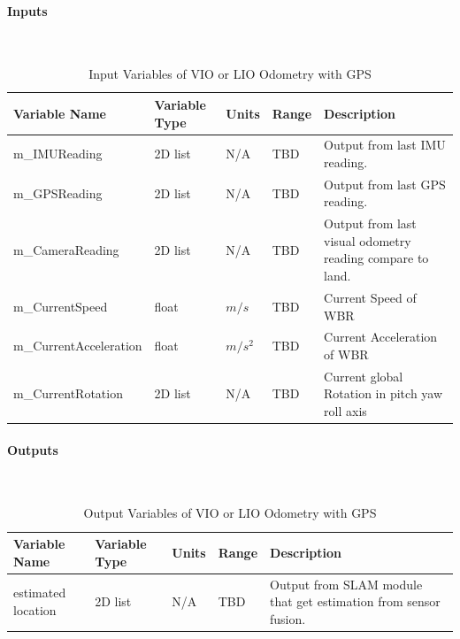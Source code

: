 \documentclass[12pt]{article}
\begin{document}
            \paragraph{Inputs}
                ~\newline
                \begin{table}[H]
                  \centering
                    \caption{Input Variables of VIO or LIO Odometry with GPS} \label{tbl:Input Variables of VIO or LIO Odometry with GPS}
                  \begin{tabularx}{\textwidth}{|p{5cm}|p{2cm}|p{1.2cm}|p{1cm}|X|}
                    \hline Variable Name & Variable Type & Units & Range & Description \\
                    \hline m\_IMUReading & 2D list &  N/A & TBD & Output from last IMU reading.\\
                    \hline m\_GPSReading & 2D list &  N/A & TBD & Output from last GPS reading.\\
                    \hline m\_CameraReading & 2D list &  N/A & TBD & Output from last visual odometry reading compare to land.\\
                    \hline m\_CurrentSpeed  & float & $m/s$ & TBD & Current Speed of WBR\\
                    \hline m\_CurrentAcceleration & float & $m/s^2$ & TBD & Current Acceleration of WBR\\
                    \hline m\_CurrentRotation & 2D list & N/A & TBD & Current global Rotation in pitch yaw roll axis\\
                    \hline
                  \end{tabularx}
                \end{table} 
                
            \paragraph{Outputs}
                ~\newline
                \begin{table}[H]
                  \centering
                    \caption{Output Variables of VIO or LIO Odometry with GPS} 
                    \label{tbl:Output Variables of VIO or LIO Odometry with GPS}
                  \begin{tabularx}{\textwidth}{|p{5cm}|p{2cm}|p{1.2cm}|p{1cm}|X|}
                    \hline Variable Name & Variable Type & Units & Range & Description \\
                    \hline estimated location & 2D list &  N/A & TBD & Output from SLAM module that get estimation from sensor fusion.\\
                    \hline
                  \end{tabularx}
                \end{table}                 
\end{document}

